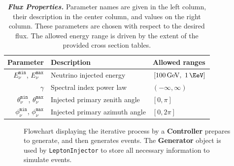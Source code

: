 \documentclass[main.tex]{subfiles}
\newcommand{\LeptonInjector}{\texttt{LeptonInjector}}
\begin{document}
\begin{table}[h!]
	\centering
    \begin{tabular}{r l  l}
        \toprule
        Parameter & Description & Allowed ranges \\
        \midrule
        $E_{\nu}^\texttt{min}$, $E_{\nu}^\texttt{max}$ & Neutrino injected energy & $ [\SI{100}\GeV,~\SI{1}\EeV]$ \\ %
        $\gamma$ & Spectral index power law & $  \left(-\infty,\infty\right)$ \\
        $\theta_{\nu}^\texttt{min}$, $\theta_{\nu}^\texttt{max}$ & Injected primary zenith angle & $\left[0,\pi\right]$ \\ 
        $\phi_{\nu}^\texttt{min}$, $\phi_{\nu}^\texttt{max}$ & Injected primary azimuth angle & $\left[0,2\pi\right]$ \\
        \bottomrule
    \end{tabular}
    \caption{\textbf{\textit{Flux Properties.}}
    Parameter names are given in the left column, their description in the center column, and values on the right column.
    These parameters are chosen with respect to the desired flux.
    The allowed energy range is driven by the extent of the provided cross section tables.
    }
    \label{tbl:injection_parameters}
\end{table}

\begin{figure}[p]
    \centering
    \caption{Flowchart displaying the iterative process by a \textbf{Controller} prepares to generate, and then generates events. The \textbf{Generator} object is used by \LeptonInjector{} to store all necessary information to simulate events.}\label{fig:flow_LI}
\end{figure}
\end{document}
